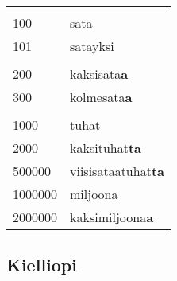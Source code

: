 \documentclass[../päätiedosto/pää.tex]{subfiles}
\begin{document}
\begin{tabularx}{\textwidth}{XX}
        &                    \\
100     & sata               \\
101     & satayksi           \\
        &                    \\
200     & kaksisata\textbf{a}         \\
300     & kolmesata\textbf{a}         \\
        &                    \\
1000    & tuhat              \\
2000    & kaksituhat\textbf{ta}       \\
500000  & viisisataatuhat\textbf{ta}  \\
1000000 & miljoona           \\
2000000 & kaksimiljoona\textbf{a}    
\end{tabularx}


\subsection{Kielliopi}
\end{document}

